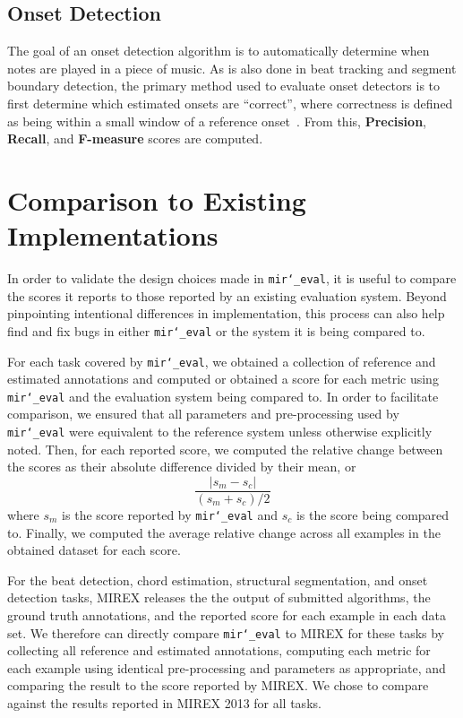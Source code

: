 \documentclass{article}
\def\mireval{\texttt{mir\char`_eval}}
\begin{document}
\subsection{Onset Detection}

The goal of an onset detection algorithm is to automatically determine when notes are played in a piece of music.
As is also done in beat tracking and segment boundary detection, the primary method
used to evaluate onset detectors is to first determine which estimated onsets are
``correct'', where correctness is defined as being within a small window of a reference
onset~\cite{bock2012evaluating}.
From this, \textbf{Precision}, \textbf{Recall}, and \textbf{F-measure} scores are computed.

\section{Comparison to Existing Implementations}
\label{sec:comparison}

In order to validate the design choices made in \mireval{}, it is useful to compare the scores it reports to those reported by an existing evaluation system.
Beyond pinpointing intentional differences in implementation, this process can also help find and fix bugs in either \mireval{} or the system it is being compared to.

For each task covered by \mireval{}, we obtained a collection of reference and estimated annotations and computed or obtained a score for each metric using \mireval{} and the evaluation system being compared to.
In order to facilitate comparison, we ensured that all parameters and pre-processing used by \mireval{} were equivalent to the reference system unless otherwise explicitly noted.
Then, for each reported score, we computed the relative change between the scores as their absolute difference divided by their mean, or
$$
\frac{|s_m - s_c|}{(s_m + s_c)/2}
$$
where $s_m$ is the score reported by \mireval{} and $s_c$ is the score being compared to.
Finally, we computed the average relative change across all examples in the obtained dataset for each score.

For the beat detection, chord estimation, structural segmentation, and onset detection tasks, MIREX releases the the output of submitted algorithms, the ground truth annotations, and the reported score for each example in each data set.
We therefore can directly compare \mireval{} to MIREX for these tasks by collecting all reference and estimated annotations, computing each metric for each example using identical pre-processing and parameters as appropriate, and comparing the result to the score reported by MIREX. 
We chose to compare against the results reported in MIREX 2013 for all tasks.
\end{document}
